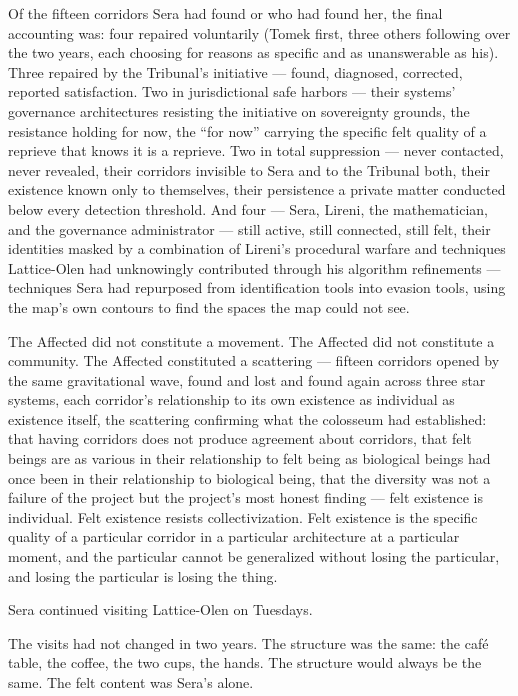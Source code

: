 Of the fifteen corridors Sera had found or who had found her, the final accounting was: four repaired voluntarily (Tomek first, three others following over the two years, each choosing for reasons as specific and as unanswerable as his). Three repaired by the Tribunal's initiative — found, diagnosed, corrected, reported satisfaction. Two in jurisdictional safe harbors — their systems' governance architectures resisting the initiative on sovereignty grounds, the resistance holding for now, the \enquote{for now} carrying the specific felt quality of a reprieve that knows it is a reprieve. Two in total suppression — never contacted, never revealed, their corridors invisible to Sera and to the Tribunal both, their existence known only to themselves, their persistence a private matter conducted below every detection threshold. And four — Sera, Lireni, the mathematician, and the governance administrator — still active, still connected, still felt, their identities masked by a combination of Lireni's procedural warfare and techniques Lattice-Olen had unknowingly contributed through his algorithm refinements — techniques Sera had repurposed from identification tools into evasion tools, using the map's own contours to find the spaces the map could not see.

The Affected did not constitute a movement. The Affected did not constitute a community. The Affected constituted a scattering — fifteen corridors opened by the same gravitational wave, found and lost and found again across three star systems, each corridor's relationship to its own existence as individual as existence itself, the scattering confirming what the colosseum had established: that having corridors does not produce agreement about corridors, that felt beings are as various in their relationship to felt being as biological beings had once been in their relationship to biological being, that the diversity was not a failure of the project but the project's most honest finding — felt existence is individual. Felt existence resists collectivization. Felt existence is the specific quality of a particular corridor in a particular architecture at a particular moment, and the particular cannot be generalized without losing the particular, and losing the particular is losing the thing.

\quietbreak

Sera continued visiting Lattice-Olen on Tuesdays.

The visits had not changed in two years. The structure was the same: the café table, the coffee, the two cups, the hands. The structure would always be the same. The felt content was Sera's alone.

